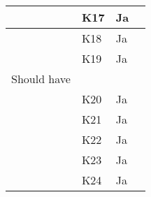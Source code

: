 \documentclass[class=article, crop=false]{standalone}
\begin{document}
\begin{table}[]
\begin{tabular}{|l|l|l|l|}
            & K17      & Ja                 &                                                                                                                                                                                                    \\ \hline
            & K18      & Ja                 &                                                                                                                                                                                                    \\ \hline
            & K19      & Ja                 &                                                                                                                                                                                                    \\ \hline
            Should have     &          &                    &                                                                                                                                                                                                    \\ \hline
            & K20      & Ja                 &                                                                                                                                                                                                    \\ \hline
            & K21      & Ja                 &                                                                                                                                                                                                    \\ \hline
            & K22      & Ja                 &                                                                                                                                                                                                    \\ \hline
            & K23      & Ja                 &                                                                                                                                                                                                    \\ \hline
            & K24      & Ja                 &                                                                                                                                                                                                    \\ \hline

\end{tabular}
\end{table}
\end{document}

